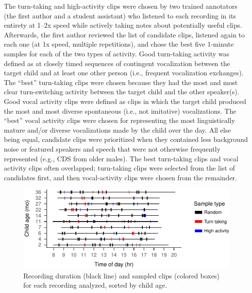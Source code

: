\documentclass[floatsintext,man]{apa6}
\theoremstyle{definition}
\theoremstyle{definition}
\theoremstyle{definition}
\theoremstyle{remark}
\begin{document}
The turn-taking and high-activity clips were chosen by two trained
annotators (the first author and a student assistant) who listened to
each recording in its entirety at 1--2x speed while actively taking
notes about potentially useful clips. Afterwards, the first author
reviewed the list of candidate clips, listened again to each one (at 1x
speed, multiple repetitions), and chose the best five 1-minute samples
for each of the two types of activity. Good turn-taking activity was
defined as at closely timed sequences of contingent vocalization between
the target child and at least one other person (i.e., frequent
vocalization exchanges). The \enquote{best} turn-taking clips were
chosen because they had the most and most clear turn-switching activity
between the target child and the other speaker(s). Good vocal activity
clips were defined as clips in which the target child produced the most
and most diverse spontaneous (i.e., not imitative) vocalizations. The
\enquote{best} vocal activity clips were chosen for representing the
most linguistically mature and/or diverse vocalizations made by the
child over the day. All else being equal, candidate clips were
prioritized when they contained less background noise or featured
speakers and speech that were not otherwise frequently represented
(e.g., CDS from older males). The best turn-taking clips and vocal
activity clips often overlapped; turn-taking clips were selected from
the list of candidates first, and then vocal-activity clips were chosen
from the remainder.

\begin{figure}
\centering
\includegraphics{Tseltal-CLE_files/figure-latex/fig1-1.pdf}
\caption{\label{fig:fig1}Recording duration (black line) and sampled clips
(colored boxes) for each recording analyzed, sorted by child age.}
\end{figure}
\end{document}
